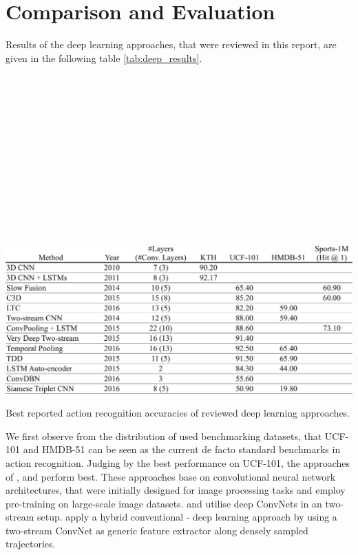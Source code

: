 \section{Comparison and Evaluation}
\label{sec:evaluation}

Results of the deep learning approaches, that were reviewed in this report, are given in the following table \ref{tab:deep_results}.

\begin{minipage}[b]{.03\linewidth}
\scriptsize
\cite{ji_3d_2013}\\
\cite{baccouche_sequential_2011}\\
\cite{karpathy_large-scale_2014}\\
\cite{tran_learning_2015}\\
\cite{varol_long-term_2016}\\
\cite{simonyan_two-stream_2014}\\
\cite{ng_beyond_2015}\\
\cite{wang_towards_2015}\\
\cite{feichtenhofer_convolutional_2016}\\
\cite{wang_action_2015}\\
\cite{srivastava_unsupervised_2015}
\cite{palasek_action_2016}
\cite{misra_shuffle_2016}
\\\\
\end{minipage}
\begin{minipage}[b]{.96\linewidth}
\begin{table}[H]
    \centering
    \includegraphics[width=\textwidth]{img_evaluation/deep_results}
    \caption{Best reported action recognition accuracies of reviewed deep learning approaches.}
    \label{tab:deep_results}
\end{table}
\end{minipage}

We first observe from the distribution of used benchmarking datasets, that UCF-101 and HMDB-51 can be seen as the current de facto standard benchmarks in action recognition.
Judging by the best performance on UCF-101, the approaches of \textcite{wang_towards_2015}, \textcite{feichtenhofer_convolutional_2016} and \textcite{wang_action_2015} perform best.
These approaches base on convolutional neural network architectures, that were initially designed for image processing tasks and employ pre-training on large-scale image datasets.
\cite{wang_towards_2015} and \cite{feichtenhofer_convolutional_2016} utilise deep ConvNets in an two-stream setup.
\cite{wang_action_2015} apply a hybrid conventional - deep learning approach by using a two-stream ConvNet as generic feature extractor along densely sampled trajectories.


